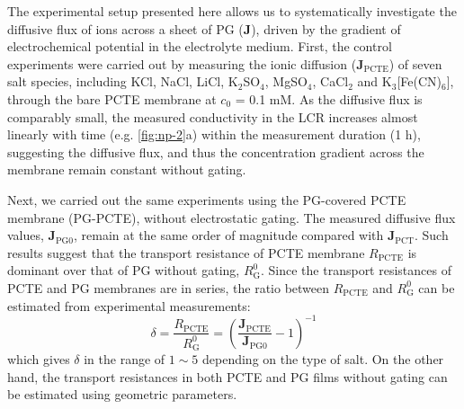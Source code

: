 The experimental setup presented
here allows us to systematically investigate the diffusive flux of
ions across a sheet of PG ($\symbf{J}$), driven by the gradient of
electrochemical potential in the electrolyte medium.
%
First, the control experiments were carried out by measuring the ionic
diffusion ($\mathbf{J}_{\mathrm{PCTE}}$) of seven salt species,
including KCl, NaCl, LiCl, K$_{2}$SO$_{4}$, MgSO$_{4}$, CaCl$_{2}$ and
K$_{3}$[Fe(CN)$_{6}$], through the bare PCTE membrane at $c_{0}$ = 0.1
mM.
%
As the diffusive flux is comparably small, the measured conductivity
in the LCR increases almost linearly with time (e.g.
\autoref{fig:np-2}a) within the measurement duration (1 h), suggesting
the diffusive flux, and thus the concentration gradient across the
membrane remain constant without gating.
%

Next, we carried out the same experiments using the PG-covered PCTE
membrane (PG-PCTE), without electrostatic gating. The measured
diffusive flux values, $\symbf{J}_{\mathrm{PG0}}$, remain at the
same order of magnitude compared with $\mathbf{J}_{\mathrm{PCT}}$.
%
Such results suggest that the transport resistance of PCTE membrane
$R_{\mathrm{PCTE}}$ is dominant over that of PG without gating,
$R_{\mathrm{G}}^{0}$.
%
Since the transport resistances of PCTE and PG membranes are in
series, the ratio between $R_{\mathrm{PCTE}}$ and $R_{\mathrm{G}}^{0}$
can be estimated from experimental measurements:
\begin{equation}
  \label{eq:np-resist-ratio}
  \delta = \frac{R_{\mathrm{PCTE}}}{R_{\mathrm{G}}^{0}}
  = \left(\frac{\symbf{J}_{\mathrm{PCTE}}}{\symbf{J}_{\mathrm{PG0}}} -1 \right)^{-1}
\end{equation}%
  which gives $\delta$ in the range of $1\sim{}5$
depending on the type of salt.
%
On the other hand, the transport resistances in both PCTE and PG films without gating can be estimated using geometric parameters.
